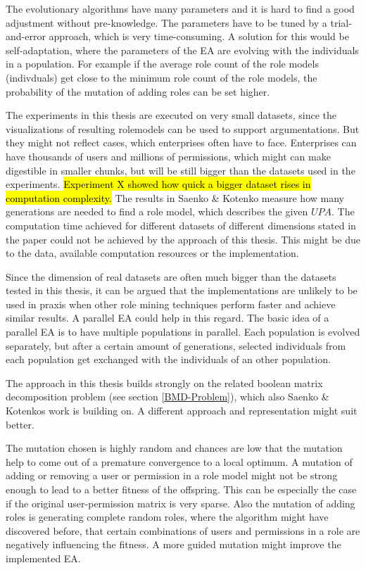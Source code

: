 The evolutionary algorithms have many parameters and it is hard to find a good adjustment without pre-knowledge. The parameters have to be tuned by a trial-and-error approach, which is very time-consuming. A solution for this would be self-adaptation, where the parameters of the EA are evolving with the individuals in a population\cite{Eiben}. For example if the average role count of the role models (indivduals) get close to the minimum role count of the role models, the probability of the mutation of adding roles can be set higher.

The experiments in this thesis are executed on very small datasets, since the visualizations of resulting rolemodels can be used to support argumentations. But they might not reflect cases, which enterprises often have to face. Enterprises can have thousands of users and millions of permissions, which might can make digestible in smaller chunks, but will be still bigger than the datasets used in the experiments. \hl{Experiment X showed how quick a bigger dataset rises in computation complexity.} The results in Saenko \& Kotenko measure how many generations are needed to find a role model, which describes the given $UPA$. The computation time achieved for different datasets of different dimensions stated in the paper could not be achieved by the approach of this thesis. This might be due to the data, available computation resources or the implementation.

Since the dimension of real datasets are often much bigger than the datasets tested in this thesis, it can be argued that the implementations are unlikely to be used in praxis when other role mining techniques perform faster and achieve similar results. A parallel EA could help in this regard. The basic idea of a parallel EA is to have multiple populations in parallel. Each population is evolved separately, but after a certain amount of generations, selected individuals from each population get exchanged with the individuals of an other population.\cite{Eiben}

The approach in this thesis builds strongly on the related boolean matrix decomposition problem (see section \ref{BMD-Problem}), which also Saenko \& Kotenkos work is building on. A different approach and representation might suit better.

The mutation chosen is highly random and chances are low that the mutation help to come out of a premature convergence to a local optimum. A mutation of adding or removing a user or permission in a role model might not be strong enough to lead to a better fitness of the offspring. This can be especially the case if the original user-permission matrix is very sparse. Also the mutation of adding roles is generating complete random roles, where the algorithm might have discovered before, that certain combinations of users and permissions in a role are negatively influencing the fitness. A more guided mutation might improve the implemented EA.

